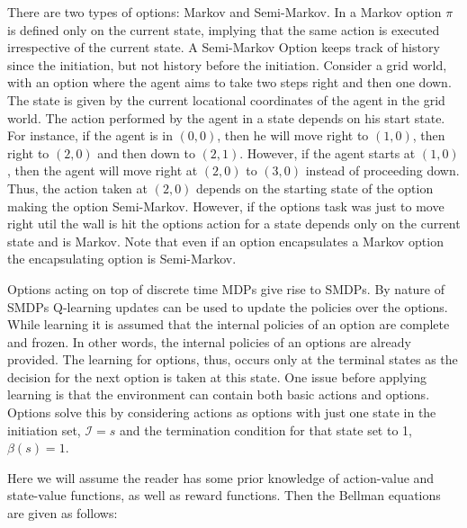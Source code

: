 There are two types of options: Markov and Semi-Markov. In a Markov option \(\pi\) is defined only on the current state, implying that the same action is executed irrespective of the current state. A Semi-Markov Option keeps track of history since the initiation, but not history before the initiation. Consider a grid world, with an option where the agent aims to take two steps right and then one down. The state is given by the current locational coordinates of the agent in the grid world. The action performed by the agent in a state depends on his start state. For instance, if the agent is in \((0,0)\), then he will move right to \((1,0)\), then right to \((2,0)\) and then down to \((2,1)\). However, if the agent starts at \((1,0)\), then the agent will move right at \((2,0)\) to \((3,0)\) instead of proceeding down. Thus, the action taken at \((2,0)\) depends on the starting state of the option making the option Semi-Markov. However, if the options task was just to move right util the wall is hit the options action for a state depends only on the current state and is Markov. Note that even if an option encapsulates a Markov option the encapsulating option is Semi-Markov.

Options acting on top of discrete time MDPs give rise to SMDPs. By nature of SMDPs Q-learning updates can be used to update the policies over the options. While learning it is assumed that the internal policies of an option are complete and frozen. In other words, the internal policies of an options are already provided. The learning for options, thus, occurs only at the terminal states as the decision for the next option is taken at this state. One issue before applying learning is that the environment can contain both basic actions and options. Options solve this by considering actions as options with just one state in the initiation set, \(\mathcal{I}=s\) and the termination condition for that state set to 1, \(\beta(s)=1\).

Here we will assume the reader has some prior knowledge of action-value and state-value functions, as well as reward functions. Then the Bellman equations are given as follows:


